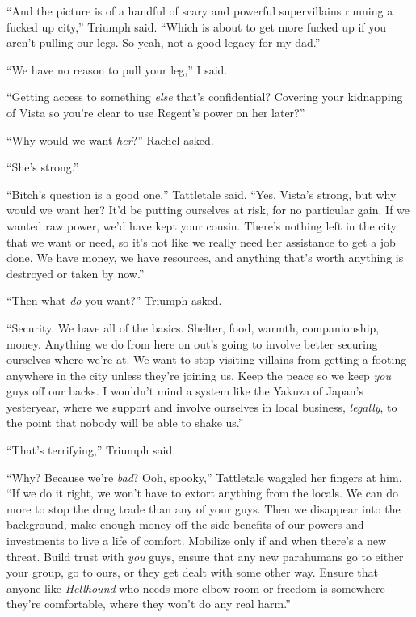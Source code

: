 ``And the picture is of a handful of scary and powerful supervillains running a fucked up city,'' Triumph said.  ``Which is about to get more fucked up if you aren't pulling our legs.  So yeah, not a good legacy for my dad.''



``We have no reason to pull your leg,'' I said.



``Getting access to something \emph{else} that's confidential?  Covering your kidnapping of Vista so you're clear to use Regent's power on her later?''



``Why would we want \emph{her}?''  Rachel asked.



``She's strong.''



``Bitch's question is a good one,'' Tattletale said.  ``Yes, Vista's strong, but why would we want her?  It'd be putting ourselves at risk, for no particular gain.  If we wanted raw power, we'd have kept your cousin.  There's nothing left in the city that we want or need, so it's not like we really need her assistance to get a job done.  We have money, we have resources, and anything that's worth anything is destroyed or taken by now.''



``Then what \emph{do} you want?'' Triumph asked.



``Security.  We have all of the basics.  Shelter, food, warmth, companionship, money.  Anything we do from here on out's going to involve better securing ourselves where we're at.  We want to stop visiting villains from getting a footing anywhere in the city unless they're joining us.  Keep the peace so we keep \emph{you} guys off our backs.  I wouldn't mind a system like the Yakuza of Japan's yesteryear, where we support and involve ourselves in local business, \emph{legally}, to the point that nobody will be able to shake us.''



``That's terrifying,'' Triumph said.



``Why?  Because we're \emph{bad}?  Ooh, spooky,'' Tattletale waggled her fingers at him.  ``If we do it right, we won't have to extort anything from the locals.  We can do more to stop the drug trade than any of your guys.  Then we disappear into the background, make enough money off the side benefits of our powers and investments to live a life of comfort.  Mobilize only if and when there's a new threat.  Build trust with \emph{you} guys, ensure that any new parahumans go to either your group, go to ours, or they get dealt with some other way.  Ensure that anyone like \emph{Hellhound} who needs more elbow room or freedom is somewhere they're comfortable, where they won't do any real harm.''



